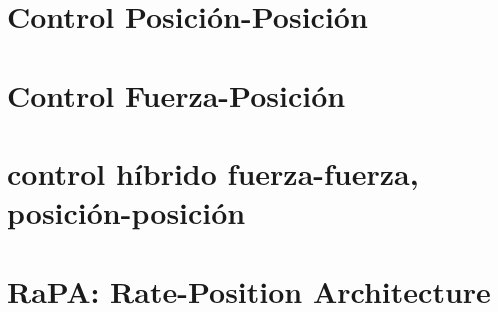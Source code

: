 






\section{Control Posición-Posición}

\section{Control Fuerza-Posición}

\section{control híbrido fuerza-fuerza, posición-posición}



\section{RaPA: Rate-Position Architecture}

